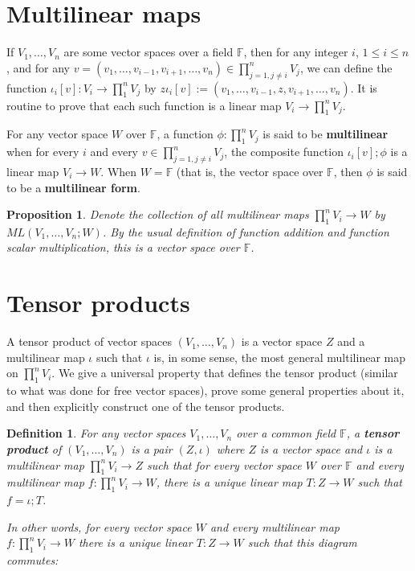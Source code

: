 \documentclass[a4paper,14pt]{article}
\newtheorem*{prop}{Proposition}
\newtheorem*{defn}{Definition}
\begin{document}
\section{Multilinear maps}
If $V_1, \ldots, V_n$ are some vector spaces over a field $\mathbb{F}$, then for any integer $i$, $1 \leq i \leq n$, and for any $v = (v_1, \ldots, v_{i-1}, v_{i+1}, \ldots, v_n) \in \prod_{j=1, j \neq i}^n V_j$, we can define the function $\iota_i[v]: V_i \to \prod_1^n V_j$ by $z \iota_i[v] := (v_1, \ldots, v_{i-1}, z, v_{i+1}, \ldots, v_n)$. It is routine to prove that each such function is a linear map $V_i \to \prod_1^n V_j$.

For any vector space $W$ over $\mathbb{F}$, a function $\phi: \prod_1^n V_j$ is said to be \textbf{multilinear} when for every $i$ and every $v \in \prod_{j=1, j \neq i}^n V_j$, the composite function $\iota_i[v];\phi$ is a linear map $V_i \to W$. When $W = \mathbb{F}$ (that is, the vector space over $\mathbb{F}$, then $\phi$ is said to be a \textbf{multilinear form}.

\begin{prop}
Denote the collection of all multilinear maps $\prod_1^n V_i \to W$ by $ML(V_1, \ldots, V_n; W)$. By the usual definition of function addition and function scalar multiplication, this is a vector space over $\mathbb{F}$.
\end{prop}

\section{Tensor products}
A tensor product of vector spaces $(V_1, \ldots, V_n)$ is a vector space $Z$ and a multilinear map $\iota$ such that $\iota$ is, in some sense, the most general multilinear map on $\prod_1^n V_i$. We give a universal property that defines the tensor product (similar to what was done for free vector spaces), prove some general properties about it, and then explicitly construct one of the tensor products.

\begin{defn}
    For any vector spaces $V_1, \ldots, V_n$ over a common field $\mathbb{F}$, a \textbf{tensor product} of $(V_1, \ldots, V_n)$ is a pair $(Z, \iota)$ where $Z$ is a vector space and $\iota$ is a multilinear map $\prod_1^n V_i \to Z$ such that for every vector space $W$ over $\mathbb{F}$ and every multilinear map $f: \prod_1^n V_i \to W$, there is a unique linear map $T: Z \to W$ such that $f = \iota;T$.

In other words, for every vector space $W$ and every multilinear map $f: \prod_1^n V_i \to W$ there is a unique linear $T: Z \to W$ such that this diagram commutes:

\begin{center}
\end{center}
\end{defn}
\end{document}
